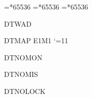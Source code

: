 \PZ=*65536\relax
\PX=*65536\relax
\PY=*65536\relax
{}

\expandafter\ifx\csname DTWAD\endcsname\relax
  \dtBuiltinMap
\else
  
  \expandafter\ifx\csname DTMAP\endcsname\relax\def\DTMAP{E1M1}\fi
  \expandafter\expandafter\expandafter\dtLoadWAD
    \expandafter\expandafter\expandafter{\expandafter\DTWAD\expandafter}%
    \expandafter{\DTMAP}%
\fi
\catcode`\@=11

\dtFindDoors

\expandafter\ifx\csname DTNOMON\endcsname\relax\else\dt@monfalse\fi
\ifdt@mon \dtSpawnMonsters \fi

\expandafter\ifx\csname DTNOMIS\endcsname\relax\else\dt@misokfalse\fi

\expandafter\ifx\csname DTNOLOCK\endcsname\relax\else\dt@lockfalse\fi

